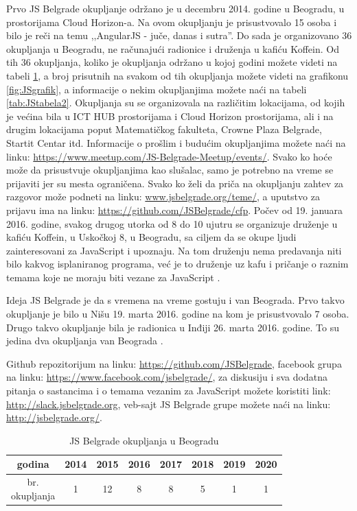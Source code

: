\documentclass[a4paper]{article}
\begin{document}
{Prvo JS Belgrade okupljanje održano je u decembru 2014. godine u Beogradu, u prostorijama Cloud Horizon-a. Na ovom okupljanju je prisustvovalo 15 osoba i bilo je reči na temu ,,AngularJS - juče, danas i sutra''. Do sada je organizovano 36 okupljanja u Beogradu, ne računajući radionice i druženja u kafiću Koffein. Od tih 36 okupljanja, koliko je okupljanja održano u kojoj godini možete videti na tabeli \ref{tab:JStabela1}, a broj prisutnih na svakom od tih okupljanja možete videti na grafikonu \ref{fig:JSgrafik}, a informacije o nekim okupljanjima možete naći na tabeli \ref{tab:JStabela2}. Okupljanja su se organizovala na različitim lokacijama, od kojih je većina bila u ICT HUB prostorijama \cite{aboutICT} i Cloud Horizon prostorijama, ali i na drugim lokacijama poput Matematičkog fakulteta, Crowne Plaza Belgrade, Startit Centar \cite{aboutStarit} itd. Informacije o prošlim i budućim okupljanjima možete naći na linku: \url{https://www.meetup.com/JS-Belgrade-Meetup/events/}. Svako ko hoće može da prisustvuje okupljanjima kao slušalac, samo je potrebno na vreme se prijaviti jer su mesta ograničena. Svako ko želi da priča na okupljanju zahtev za razgovor može podneti na linku: \url{www.jsbelgrade.org/teme/}, a uputstvo za prijavu ima na linku: \url{https://github.com/JSBelgrade/cfp}. Počev od 19. januara 2016. godine, svakog drugog utorka od 8 do 10 ujutru  se organizuje druženje u kafiću Koffein, u Uskočkoj 8, u Beogradu, sa ciljem da se okupe ljudi zainteresovani za JavaScript i upoznaju. Na tom druženju nema predavanja niti bilo kakvog isplaniranog programa, već je to druženje uz kafu i pričanje o raznim temama koje ne moraju biti vezane za JavaScript \cite{JS_Belgrade_meetup_pocetna}.

Ideja JS Belgrade je da s vremena na vreme gostuju i van Beograda. Prvo takvo okupljanje je bilo u Nišu 19. marta 2016. godine na kom je prisustvovalo 7 osoba. Drugo takvo okupljanje bila je radionica u Inđiji 26. marta 2016. godine. To su jedina dva okupljanja van Beograda \cite{JS_Belgrade_meetup_pocetna}.

Github repozitorijum na linku: \url{https://github.com/JSBelgrade}, facebook grupa na linku: \url{https://www.facebook.com/jsbelgrade/},
za diskusiju i sva dodatna pitanja o sastancima i o temama vezanim za JavaScript možete koristiti link: \url{http://slack.jsbelgrade.org}, veb-sajt JS Belgrade grupe možete naći na linku: \url{http://jsbelgrade.org/}.

\begin{table}[h!]
\begin{center}
\caption{JS Belgrade okupljanja u Beogradu}
\begin{tabular}{ |c|c|c|c|c|c|c|c| } 
 \hline
 godina & 2014 & 2015 & 2016 & 2017 & 2018 & 2019 & 2020 \\ 
 \hline
 \makecell[c]{br.\\okupljanja} & 1 & 12 & 8 & 8 & 5 & 1 & 1 \\
 \hline
\end{tabular}
\label{tab:JStabela1}
\end{center}
\end{table}

}
\end{document}
